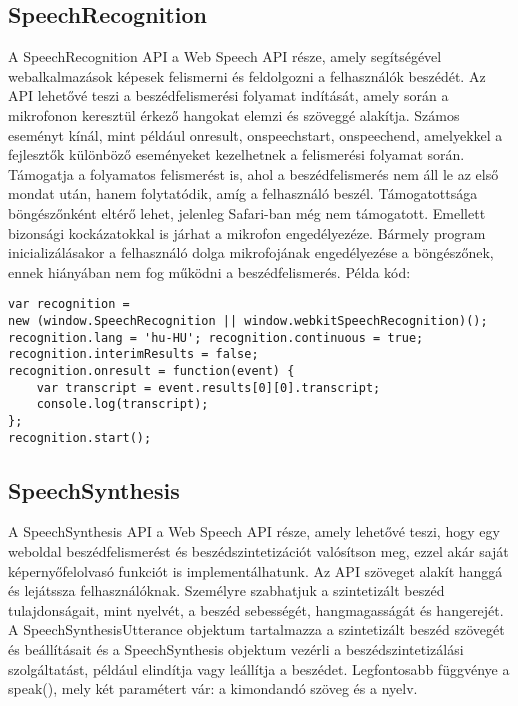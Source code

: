\documentclass[12pt]{report}
\begin{document}
\subsection{SpeechRecognition}
A SpeechRecognition \cite{speechrecognition} API a Web Speech API része, amely segítségével webalkalmazások képesek felismerni és feldolgozni a felhasználók beszédét. Az API lehetővé teszi a beszédfelismerési folyamat indítását, amely során a mikrofonon keresztül érkező hangokat elemzi és szöveggé alakítja. Számos eseményt kínál, mint például onresult, onspeechstart, onspeechend, amelyekkel a fejlesztők különböző eseményeket kezelhetnek a felismerési folyamat során. Támogatja a folyamatos felismerést is, ahol a beszédfelismerés nem áll le az első mondat után, hanem folytatódik, amíg a felhasználó beszél.
\newline
Támogatottsága böngészőnként eltérő lehet, jelenleg Safari-ban még nem támogatott. Emellett bizonsági kockázatokkal is járhat a mikrofon engedélyezéze. Bármely program inicializálásakor a felhasználó dolga mikrofojának engedélyezése a böngészőnek, ennek hiányában nem fog működni a beszédfelismerés.
\newline
Példa kód:
\begin{verbatim}
var recognition =
new (window.SpeechRecognition || window.webkitSpeechRecognition)();
recognition.lang = 'hu-HU'; recognition.continuous = true;
recognition.interimResults = false;
recognition.onresult = function(event) {
    var transcript = event.results[0][0].transcript;
    console.log(transcript);
};
recognition.start();
\end{verbatim}

\subsection{SpeechSynthesis}
A SpeechSynthesis \cite{speechsynthesis} API a Web Speech API része, amely lehetővé teszi, hogy egy weboldal beszédfelismerést és beszédszintetizációt valósítson meg, ezzel akár saját képernyőfelolvasó funkciót is implementálhatunk. Az API szöveget alakít hanggá és lejátssza felhasználóknak. Személyre szabhatjuk a szintetizált beszéd tulajdonságait, mint nyelvét, a beszéd sebességét, hangmagasságát és hangerejét. A SpeechSynthesisUtterance objektum tartalmazza a szintetizált beszéd szövegét és beállításait és a SpeechSynthesis objektum vezérli a beszédszintetizálási szolgáltatást, például elindítja vagy leállítja a beszédet. Legfontosabb függvénye a speak(), mely két paramétert vár: a kimondandó szöveg és a nyelv.
\pagebreak
\end{document}
